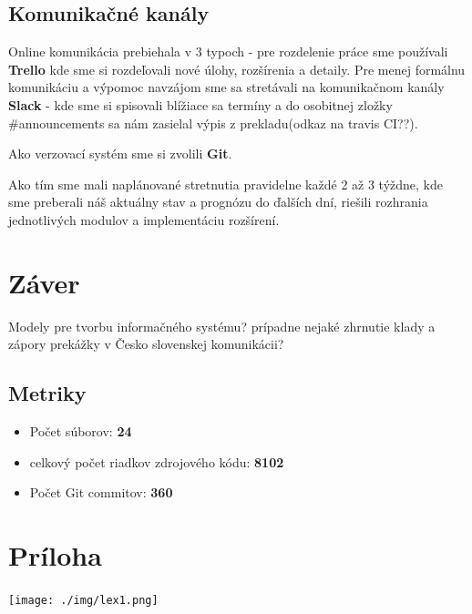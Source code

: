 \documentclass[12pt,a4paper]{report}
\begin{document}
\section{Komunikačné kanály}
\par Online komunikácia prebiehala v 3 typoch - pre rozdelenie práce sme používali \textbf{Trello} kde sme si rozdeľovali nové úlohy, rozšírenia a detaily. Pre menej formálnu komunikáciu a výpomoc navzájom sme sa stretávali na komunikačnom kanály \textbf{Slack} - kde sme si spisovali blížiace sa termíny a do osobitnej zložky \#announcements sa nám zasielal výpis z prekladu(odkaz na travis CI??).
\par Ako verzovací systém sme si zvolili \textbf{Git}.
\par Ako tím sme mali naplánované stretnutia pravidelne každé 2 až 3 týždne, kde sme preberali náš aktuálny stav a prognózu do ďalších dní, riešili rozhrania jednotlivých modulov a implementáciu rozšírení.

\chapter{Záver}
Modely pre tvorbu informačného systému? prípadne nejaké zhrnutie klady a zápory prekážky v Česko slovenskej komunikácii?
\section{Metriky}
\begin{itemize}
\item Počet súborov: \textbf{24}
\item celkový počet riadkov zdrojového kódu: \textbf{8102}
\item Počet Git commitov: \textbf{360}
\end{itemize}
\chapter{Príloha}
\texttt{[image: ./img/lex1.png]}\\
\end{document}

